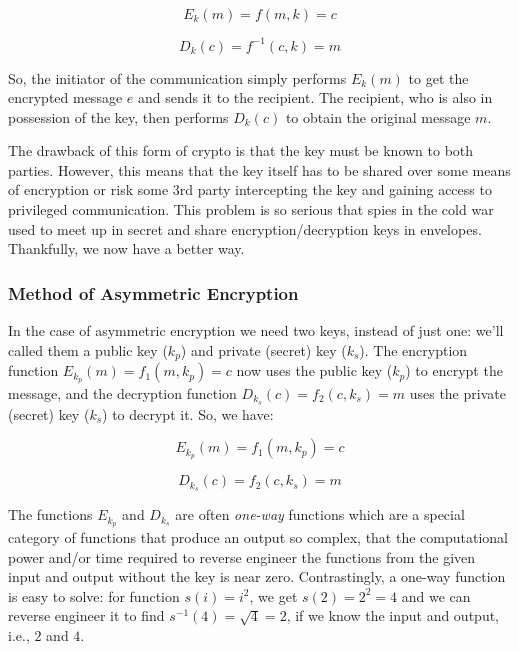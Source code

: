 \begin{equation}
	E_k(m) = f(m,k) = c
\end{equation}
\vspace{-30pt}

\begin{equation}
	D_k(c) = f^{-1}(c,k) = m
\end{equation}

\noindent
So, the initiator of the communication simply performs $E_k(m)$ to get the encrypted message $e$ and sends it to the recipient. The recipient, who is also in possession of the key, then performs $D_k(c)$ to obtain the original message $m$. 

The drawback of this form of crypto is that the key must be known to both parties. However, this means that the key itself has to be shared over some means of encryption or risk some 3rd party intercepting the key and gaining access to privileged communication. This problem is so serious that spies in the cold war used to meet up in secret and share encryption/decryption keys in envelopes. Thankfully, we now have a better way.

\subsubsection{Method of Asymmetric Encryption}
\vspace{-10pt}
In the case of asymmetric encryption we need two keys, instead of just one: we'll called them a public key ($k_p$) and private (secret) key ($k_s$). The encryption function $E_{k_p}(m)=f_1(m,k_p)=c$ now uses the public key ($k_p$) to encrypt the message, and the decryption function $D_{k_s}(c)=f_2(c,k_s)=m$ uses the private (secret) key ($k_s$) to decrypt it. So, we have:

\begin{equation}
	E_{k_p}(m)=f_1(m,k_p)=c
\end{equation}
\vspace{-30pt}

\begin{equation}
	D_{k_s}(c)=f_2(c,k_s)=m
\end{equation}

\noindent
The functions $E_{k_p}$ and $D_{k_s}$ are often \textit{one-way} functions which are a special category of functions that produce an output so complex, that the computational power and/or time required to reverse engineer the functions from the given input and output without the key is near zero. Contrastingly, a one-way function is easy to solve: for function $s(i)=i^2$, we get $s(2)=2^2=4$ and we can reverse engineer it to find $s^{-1}(4)=\sqrt{4}=2$, if we know the input and output, i.e., $2$ and $4$. 

